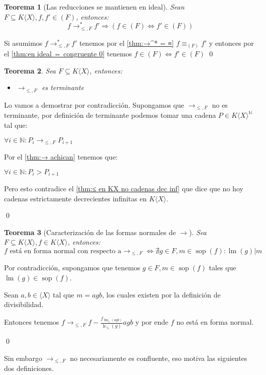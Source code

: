 \documentclass{amsbook} %
\theoremstyle{customstyle}
\newtheorem{theorem}{Teorema}[chapter]
\renewenvironment{proof}[1][\proofname]{{\bfseries #1: }}{\qed} %
\theoremstyle{factstyle}
\DeclareMathOperator{\sop}{sop}
\DeclareMathOperator{\lm}{lm}
\DeclareMathOperator{\lc}{lc}
\begin{document}
\begin{theorem}[Las reducciones se mantienen en ideal]\label{thm:→ mantiene pertenencia a ideal}
Sean $F ⊆ K⟨X⟩, f, f' ∈ (F)$, entonces:
\[ f →^*_{≤, F} f' ⇒ (f ∈ (F) ⇔ f' ∈ (F)) \]
\end{theorem}
\begin{proof}
Si asumimos $f →^*_{≤, F} f'$ tenemos por el \cref{thm:→^* = ≡} $f ≡_{(F)} f'$ y entonces por el \cref{thm:en ideal ⇔ congruente 0} tenemos $f ∈ (F) ⇔ f' ∈ (F)$
\end{proof}

\begin{theorem}
Sea $F ⊆ K⟨X⟩$, entonces:
\begin{itemize}
\item $→_{≤, F}$ es terminante
\end{itemize}
\end{theorem}
\begin{proof} Lo vamos a demostrar por contradicción. Supongamos que $→_{≤, F}$ no es terminante, por definición de terminante podemos tomar una cadena $P ∈ K⟨X⟩^ℕ$ tal que:

$∀i ∈ ℕ : P_i →_{≤, F} P_{i+1}$

Por el \cref{thm:→ achican} tenemos que:

$∀i ∈ ℕ : P_i > P_{i+1}$

Pero esto contradice el \cref{thm:≤ en KX no cadenas dec inf} que dice que no hoy cadenas estrictamente decrecientes infinitas en $K⟨X⟩$.

\end{proof}

\begin{theorem}[Caracterización de las formas normales de $→$]
Sea $F ⊆ K⟨X⟩, f ∈ K⟨X⟩$, entonces: %
\[ f\text{ está en forma normal con respecto a} →_{≤, F} ⇔ ∄g ∈ F, m ∈ \sop(f) : \lm(g) | m \]
\end{theorem}
\begin{proof}
Por contradicción, supongamos que tenemos $g ∈ F, m ∈ \sop(f)$ tales que $\lm(g) ∈ \sop(f)$.

Sean $a, b ∈ ⟨X⟩$ tal que $m = agb$, los cuales existen por la definición de divisibilidad.

Entonces tenemos $f →_{≤, F} f - \frac{f_{\lm_≤(agb)}}{\lc_≤(g)}agb$ y por ende $f$ no está en forma normal.

\end{proof}

Sin embargo $→_{≤, F}$ no necesariamente es confluente, eso motiva las siguientes dos definiciones.
\end{document}
